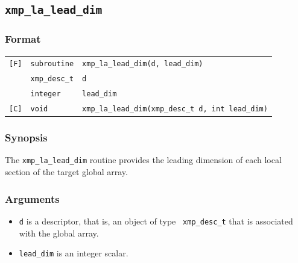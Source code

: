\subsection{\tt xmp\_la\_lead\_dim}

\subsubsection*{Format}

\begin{tabular}{lll}

\verb![F]!&  {\tt subroutine}& {\tt xmp\_la\_lead\_dim(d, lead\_dim)}\\
          & {\tt xmp\_desc\_t} & {\tt d}\\
          & {\tt integer} & {\tt lead\_dim}\\

\verb![C]!&  {\tt void}& {\tt xmp\_la\_lead\_dim(xmp\_desc\_t d, int lead\_dim)}\\

\end{tabular}

\subsubsection*{Synopsis}

The {\tt xmp\_la\_lead\_dim} routine provides the leading dimension of
each local section of the target global array.

\subsubsection*{Arguments}

\begin{itemize}
 \item {\tt d} is a descriptor, that is, an object of type {\tt
       xmp\_desc\_t} that is associated with the global array.
 \item {\tt lead\_dim} is an integer scalar.
\end{itemize}


